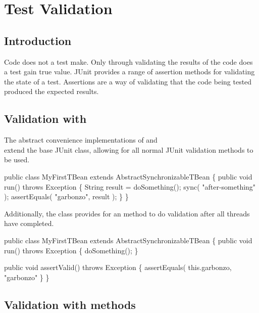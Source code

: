 \chapter{Test Validation}

\section{Introduction}

Code does not a test make.  Only through validating the results
of the code does a test gain true value.  JUnit provides a range
of assertion  methods for validating the state
of a test.  Assertions are a way of validating that the code
being tested produced the expected results.

\section{Validation with }

The abstract convenience  implementations of
 and \\
 extend the
base JUnit  class, allowing for all
normal JUnit validation methods to be used.

\begin{codelisting}
public class MyFirstTBean
    extends AbstractSynchronizableTBean
\{
    public void run()
        throws Exception
    \{
        String result = doSomething();
        sync( "after-something" );
        assertEquals( "garbonzo",
                      result );
    \}
\}
\end{codelisting}

Additionally, the  class provides for an
 method to do validation
after all threads have completed.

\begin{codelisting}
public class MyFirstTBean
    extends AbstractSynchronizableTBean
\{
    public void run()
        throws Exception
    \{
        doSomething();
    \}

    public void assertValid()
        throws Exception
    \{
        assertEquals( this.garbonzo,
                      "garbonzo"
    \}
\}
\end{codelisting}

\section{Validation with  methods}

